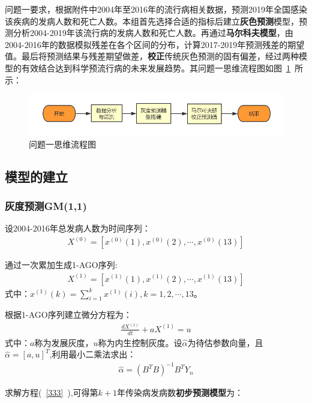 \documentclass{whutmod}
\begin{document}
    问题一要求，根据附件中2004年至2016年的流行病相关数据，预测2019年全国感染该疾病的发病人数和死亡人数。本组首先选择合适的指标后建立\textbf{灰色预测}模型，预测分析2004-2019年该流行病的发病人数和死亡人数。再通过\textbf{马尔科夫模型}，由2004-2016年的数据模拟残差在各个区间的分布，计算2017-2019年预测残差的期望值。最后将预测结果与残差期望做差，\textbf{校正}传统灰色预测的固有偏差，经过两种模型的有效结合达到科学预流行病的未来发展趋势。其问题一思维流程图如图~\ref{lct}~所示：

       \begin{figure}[H]
   	\centering
   	\includegraphics[width=\textwidth]{figures/lctc.png}
   	\caption{问题一思维流程图}\label{lct}
   \end{figure}

   
	    \subsection{模型的建立}
	    \subsubsection{灰度预测GM(1,1)}
	    设2004-2016年总发病人数为时间序列：
	     \begin{gather*}
	    X^{(0)}=[x^{(0)}(1),x^{(0)}(2),\cdots,x^{(0)}(13)]
	    \end{gather*}
	    
	    通过一次累加生成1-AGO序列:
	    \begin{gather*}
	    X^{(1)}=[x^{(1)}(1),x^{(1)}(2),\cdots,x^{(1)}(13)]
	    \end{gather*}
	    式中：$x^{(1)}(k)=\sum_{i=1}^{k}x^{(1)}(i),k=1,2,\cdots,13$。
	    
	    根据1-AGO序列建立微分方程为\cite{bib:one}：
	     \begin{gather}\label{333}
	    \frac{d X^{(1)}}{dt}+a X^{(1)} = u
	     \end{gather}
	     式中：$a$称为发展灰度，$u$称为内生控制灰度。设$\widehat{\alpha}$为待估参数向量，且$\widehat{\alpha }=[a,u]^T$,利用最小二乘法求出：
	     \begin{gather}
	     \widehat{\alpha }=(B^TB)^{-1}B^{T}Y_{n}
	     \end{gather}

	     
	     求解方程(~\ref{333}~),可得第$k+1$年传染病发病数\textbf{初步预测模型}为：
\end{document}
